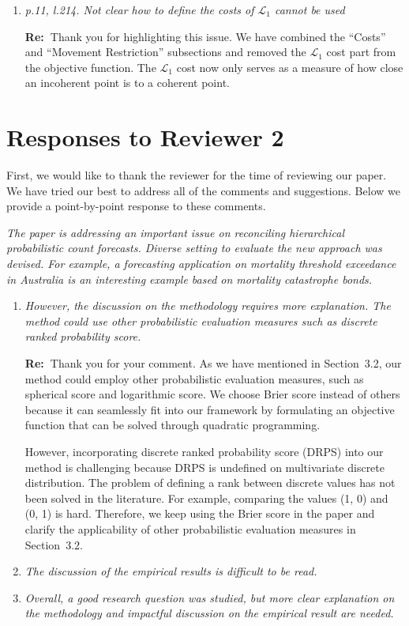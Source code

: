 \documentclass[11pt,a4paper]{article}
\newcommand{\RE}[2][Re:~]{{\color{blue}\textbf{#1}#2}}
\begin{document}
\begin{enumerate}
\begin{enumerate}
    \RE{Done. Thank you.}
    \item \textit{p.11, l.214. Not clear how to define the costs of $\mathcal{L}_1$ cannot be used}
    
    \RE{Thank you for highlighting this issue. We have combined the ``Costs'' and ``Movement Restriction'' subsections and removed the $\mathcal{L}_1$ cost part from the objective function. The $\mathcal{L}_1$ cost now only serves as a measure of how close an incoherent point is to a coherent point.}

  \end{enumerate}

\end{enumerate}
\newpage
\section*{Responses to Reviewer 2}\label{reviewer-2-comments}

\RE[]{First, we would like to thank the reviewer for the time of reviewing our paper. We have tried our best to address all of the comments and suggestions. Below we provide a point-by-point response to these comments.}

\textit{The paper is addressing an important issue on reconciling hierarchical probabilistic count forecasts. Diverse setting to evaluate the new approach was devised. For example, a forecasting application on mortality threshold exceedance in Australia is an interesting example based on mortality catastrophe bonds.}

\begin{enumerate}
    \item \textit{However, the discussion on the methodology requires more explanation. The method could use other probabilistic evaluation measures such as discrete ranked probability score.}
   
    \RE{Thank you for your comment. As we have mentioned in Section~3.2, our method could employ other probabilistic evaluation measures, such as spherical score and logarithmic score. We choose Brier score instead of others because it can seamlessly fit into our framework by formulating an objective function that can be solved through quadratic programming.
    
    However, incorporating discrete ranked probability score (DRPS) into our method is challenging because DRPS is undefined on multivariate discrete distribution. The problem of defining a rank between discrete values has not been solved in the literature. For example, comparing the values (1, 0) and (0, 1) is hard. Therefore, we keep using the Brier score in the paper and clarify the applicability of other probabilistic evaluation measures in Section~3.2.
    }

    \item \textit{The discussion of the empirical results is difficult to be read.}
    \item \textit{Overall, a good research question was studied, but more clear explanation on the methodology and impactful discussion on the empirical result are needed.}
\end{enumerate}
\end{document}
